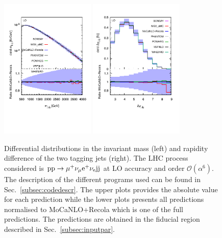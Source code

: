  \begin{figure}[htb!]
   \centering
   \includegraphics[width=0.4\textwidth,angle=0,clip=true,trim={0.4cm 2cm 0.cm 1.cm}]{figures/LO/mjj_LO.pdf}
   \includegraphics[width=0.4\textwidth,angle=0,clip=true,trim={0.4cm 2cm 0.cm 1.cm}]{figures/LO/dyj1j2_LO.pdf}
\caption{\label{fig:wg1_mjj-llLO} Differential distributions in the invariant mass (left) and rapidity difference of the two tagging jets (right).
The LHC process considered is ${\rm p}{\rm p}\to\mu^+\nu_\mu{\rm e}^+\nu_{\rm e}{\rm j}{\rm j}$ at LO accuracy and order $\mathcal{O}(\alpha^6)$.
The description of the different programs used can be found in Sec.~\ref{subsec:codedescr}.
The upper plots provides the absolute value for each prediction while the lower plots presents all predictions normalised to {\sc MoCaNLO}+{\sc Recola} which is one of the full predictions.
The predictions are obtained in the fiducial region described in Sec.~\ref{subsec:inputpar}.}
\end{figure}

